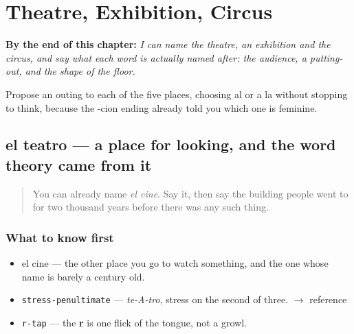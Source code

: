 
\chapter{Theatre, Exhibition, Circus}
\label{ch:teatro-exposicion-circo}

\begin{chapteropening}
\textbf{By the end of this chapter:} \emph{I can name the theatre, an exhibition and the circus, and say what each word is actually named after: the audience, a putting-out, and the shape of the floor.}

Propose an outing to each of the five places, choosing al or a la without stopping to think, because the -cion ending already told you which one is feminine.
\end{chapteropening}

\section[el teatro]{el teatro — a place for looking, and the word theory came from it}

\label{lesson:ES-C420-teatro}



\begin{quote}
You can already name \emph{el cine}. Say it, then say the building people went to for two thousand years before there was any such thing.
\end{quote}

\subsection*{What to know first}
\begin{itemize}
\raggedright
  \item el cine — the other place you go to watch something, and the one whose name is barely a century old.
\end{itemize}

\begin{sounds}
\begin{itemize}
\raggedright
  \item \texttt{stress-penultimate} — \emph{te-A-tro}, stress on the second of three. $\to$ reference
  \item \texttt{r-tap} — the \textbf{r} is one flick of the tongue, not a growl.
\end{itemize}
\end{sounds}


